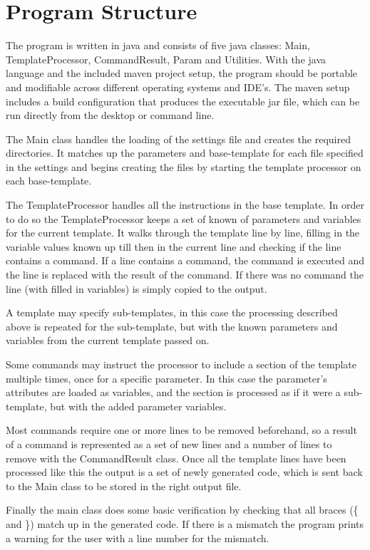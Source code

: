 \documentclass{settings/TU_Delft_Report}
\begin{document}
\chapter{Program Structure}
The program is written in java and consists of five java classes: Main, TemplateProcessor, CommandResult, Param and Utilities. With the java language and the included maven project setup, the program should be portable and modifiable across different operating systems and IDE's. The maven setup includes a build configuration that produces the executable jar file, which can be run directly from the desktop or command line.

\vsp The Main class handles the loading of the settings file and creates the required directories. It matches up the parameters and base-template for each file specified in the settings and begins creating the files by starting the template processor on each base-template.

\vsp The TemplateProcessor handles all the instructions in the base template. In order to do so the TemplateProcessor keeps a set of known of parameters and variables for the current template. It walks through the template line by line, filling in the variable values known up till then in the current line and checking if the line contains a command. If a line contains a command, the command is executed and the line is replaced with the result of the command. If there was no command the line (with filled in variables) is simply copied to the output.

A template may specify sub-templates, in this case the processing described above is repeated for the sub-template, but with the known parameters and variables from the current template passed on.

Some commands may instruct the processor to include a section of the template multiple times, once for a specific parameter. In this case the parameter's attributes are loaded as variables, and the section is processed as if it were a sub-template, but with the added parameter variables.

Most commands require one or more lines to be removed beforehand, so a result of a command is represented as a set of new lines and a number of lines to remove with the CommandResult class. Once all the template lines have been processed like this the output is a set of newly generated code, which is sent back to the Main class to be stored in the right output file.

\vsp Finally the main class does some basic verification by checking that all braces (\{ and \}) match up in the generated code. If there is a mismatch the program prints a warning for the user with a line number for the mismatch.
\end{document}
